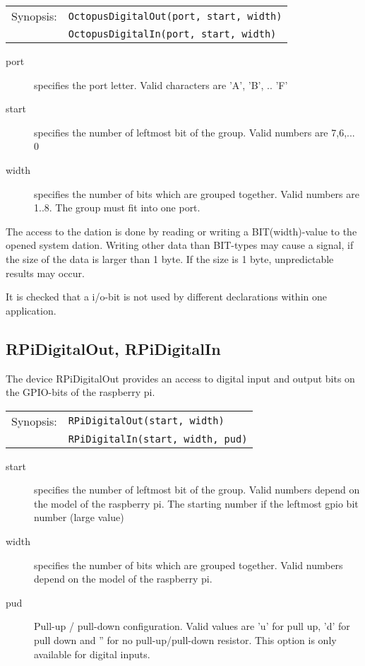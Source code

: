 \begin{tabular}{ll}
Synopsis:& \verb|OctopusDigitalOut(port, start, width)|\\
        & \verb|OctopusDigitalIn(port, start, width)|\\
\end{tabular}

\begin{description}
\item [port] specifies the port letter. Valid characters are 'A', 'B', .. 'F'
\item[start] specifies the number of leftmost bit of the group. Valid numbers
     are 7,6,... 0
\item [width] specifies the number of bits which are grouped together.
     Valid numbers are 1..8.
     The group must fit into one port.
\end{description}

The access to the dation is done by reading or writing a BIT(width)-value to the
opened system dation. 
Writing other data than BIT-types  may cause a signal, if the size of the
data is larger than 1 byte. If the size is 1 byte, unpredictable results may
occur.

It is checked that a i/o-bit is not used by different declarations within
one application.
  
\subsection{RPiDigitalOut, RPiDigitalIn}
The device RPiDigitalOut provides an access to digital input and output bits
on the GPIO-bits of the raspberry pi.

\begin{tabular}{ll}
Synopsis: & \verb|RPiDigitalOut(start, width)| \\
          & \verb|RPiDigitalIn(start, width, pud)| \\
\end{tabular}

\begin{description}
\item[start] specifies the number of leftmost bit of the group. Valid numbers
     depend on the model of the raspberry pi. The starting number if
     the leftmost gpio bit number (large value)
\item [width] specifies the number of bits which are grouped together.
     Valid numbers depend on the model of the raspberry pi.
\item [pud] Pull-up / pull-down configuration.
    Valid values are 'u' for pull up, 'd' for pull down and 
    '' for no pull-up/pull-down resistor. This option is only
    available for digital inputs.
\end{description}

